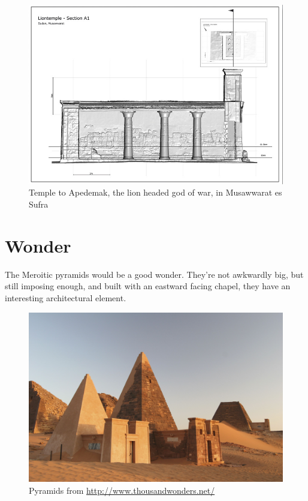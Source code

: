 \documentclass[a4paper,12pt]{scrreprt}
\begin{document}
\begin{figure}[H]
	\centering
	\includegraphics[width=\textwidth]{img/temple/apedemak_temple_profile}
	\caption{Temple to Apedemak, the lion headed god of war, in Musawwarat es Sufra}
\end{figure}

\section{Wonder}

The Meroitic pyramids would be a good wonder. They’re not awkwardly big, but still imposing enough, and built with an eastward facing chapel, they have an interesting architectural element.

\begin{figure}[H]
	\centering
	\includegraphics[width=\textwidth]{img/wonder/nubian_pyramids_original}
	\caption{Pyramids from \url{http://www.thousandwonders.net/}}
\end{figure}
\end{document}
